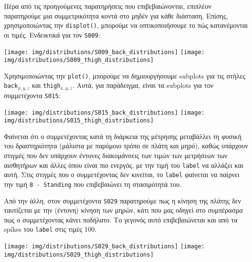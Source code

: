         Πέρα από τις προηγούμενες παρατηρήσεις που επιβεβαιώνονται, επιπλέον παρατηρούμε μια συμμετρικότητα κοντά στο μηδέν
        για κάθε διάσταση. Επίσης, χρησιμοποιώντας την \texttt{displot()}, μπορούμε να οπτικοποιήσουμε το πώς κατανέμονται οι τιμές.
        Ενδεικτικά για τον \texttt{S009}:

        \begin{multicols}{2} \centering
            \texttt{[image: img/distributions/S009\_back\_distributions]}
            \texttt{[image: img/distributions/S009\_thigh\_distributions]}
        \end{multicols}

        Χρησιμοποιώντας την \texttt{plot()}, μπορούμε να δημιουργήσουμε subplots για τις στήλες \texttt{back}\(_{x,y,z}\)
        και \texttt{thigh}\(_{x,y,z}\). Αυτά, για παράδειγμα, είναι τα subplots για τον συμμετέχοντα \texttt{S015}:

        \begin{multicols}{2} \centering
            \noindent\texttt{[image: img/distributions/S015\_back\_distributions]}
            \texttt{[image: img/distributions/S015\_thigh\_distributions]}
        \end{multicols}

        Φαίνεται ότι ο συμμετέχοντας κατά τη διάρκεια της μέτρησης μεταβάλλει τη φυσική του δραστηριότητα (μάλιστα με παρόμοιο τρόπο σε πλάτη και μηρό),
        καθώς υπάρχουν στιγμές που δεν υπάρχουν έντονες διακυμάνσεις των τιμών των μετρήσεων των αισθητήρων και άλλες όπου είναι πιο ενεργός,
        με την τιμή του \texttt{label} να αλλάζει και αυτή. Στις στιγμές που ο συμμετέχοντας δεν κινείται, το \texttt{label}
        φαίνεται να παίρνει την τιμή \texttt{8 - Standing} που επιβεβαιώνει τη στασιμότητά του.

        Από την άλλη, στον συμμετέχοντα \texttt{S029} παρατηρούμε πως η κίνηση της πλάτης δεν ταυτίζεται με την (έντονη) κίνηση των μηρών,
        κάτι που μας οδηγεί στο συμπέρασμα πως ο συμμετέχοντας κάνει ποδήλατο.
        Το γεγονός αυτό επιβεβαιώνεται και από τα spikes του \texttt{label} στις τιμές 100.

        \begin{multicols}{2} \centering
            \noindent\texttt{[image: img/distributions/S029\_back\_distributions]}
            \texttt{[image: img/distributions/S029\_thigh\_distributions]}
        \end{multicols}

